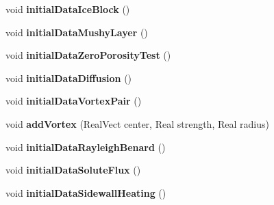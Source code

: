 \begin{DoxyCompactItemize}
\item 
\hypertarget{class_a_m_r_level_mushy_layer_af0a22602d233dba91f217a4a2a9136b3}{void {\bfseries initial\-Data\-Ice\-Block} ()}\label{class_a_m_r_level_mushy_layer_af0a22602d233dba91f217a4a2a9136b3}

\item 
\hypertarget{class_a_m_r_level_mushy_layer_a601849adc5f5b5fc9e9999b568020922}{void {\bfseries initial\-Data\-Mushy\-Layer} ()}\label{class_a_m_r_level_mushy_layer_a601849adc5f5b5fc9e9999b568020922}

\item 
\hypertarget{class_a_m_r_level_mushy_layer_a68a589a8bddf6c0ef6a0ef4987c1e1ce}{void {\bfseries initial\-Data\-Zero\-Porosity\-Test} ()}\label{class_a_m_r_level_mushy_layer_a68a589a8bddf6c0ef6a0ef4987c1e1ce}

\item 
\hypertarget{class_a_m_r_level_mushy_layer_ab258a56bea5c0a889040d751c074f1ce}{void {\bfseries initial\-Data\-Diffusion} ()}\label{class_a_m_r_level_mushy_layer_ab258a56bea5c0a889040d751c074f1ce}

\item 
\hypertarget{class_a_m_r_level_mushy_layer_a2890289b25f3e4ea6b698ddb0d6b9223}{void {\bfseries initial\-Data\-Vortex\-Pair} ()}\label{class_a_m_r_level_mushy_layer_a2890289b25f3e4ea6b698ddb0d6b9223}

\item 
\hypertarget{class_a_m_r_level_mushy_layer_aa17f3ed72486c33689944f8c9ec5cce1}{void {\bfseries add\-Vortex} (Real\-Vect center, Real strength, Real radius)}\label{class_a_m_r_level_mushy_layer_aa17f3ed72486c33689944f8c9ec5cce1}

\item 
\hypertarget{class_a_m_r_level_mushy_layer_a376041439f9a4d8a2d62fbbd199f81f5}{void {\bfseries initial\-Data\-Rayleigh\-Benard} ()}\label{class_a_m_r_level_mushy_layer_a376041439f9a4d8a2d62fbbd199f81f5}

\item 
\hypertarget{class_a_m_r_level_mushy_layer_a36fcaecdd8d8033bdfb0d3492df1be20}{void {\bfseries initial\-Data\-Solute\-Flux} ()}\label{class_a_m_r_level_mushy_layer_a36fcaecdd8d8033bdfb0d3492df1be20}

\item 
\hypertarget{class_a_m_r_level_mushy_layer_a975f7e7062b5944e9e13c3d13fc27115}{void {\bfseries initial\-Data\-Sidewall\-Heating} ()}\label{class_a_m_r_level_mushy_layer_a975f7e7062b5944e9e13c3d13fc27115}


\end{DoxyCompactItemize}
